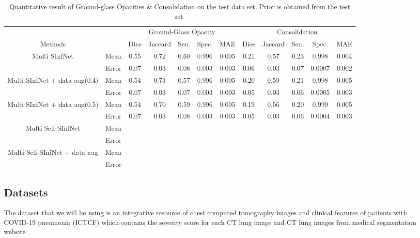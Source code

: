 \begin{table}[!h]
	\centering
	\begin{tabular}{| c | c || c c c c c || c c c c c |}
		\hline
		& &\multicolumn{5}{c||}{Ground-Glass Opacity} & \multicolumn{5}{c|}{Consolidation}\\ \cline{3-12}
		Methods & & Dice & Jaccard & Sen. & Spec. & MAE & Dice & Jaccard & Sen. & Spec. & MAE \\\hline
		Multi SInfNet & Mean & 0.55 & 0.72 & 0.60 & 0.996 & 0.005 & 0.21 & 0.57  &0.23  &0.998  &0.004   \\ \cline{2-12}
		& Error & 0.07 & 0.03 & 0.08 & 0.003 & 0.003 & 0.06 & 0.03 & 0.07 & 0.0007 & 0.002 \\ \hline \hline
		
		Multi SInfNet + data aug(0.4) & Mean & 0.54 & 0.73 & 0.57 & 0.996 & 0.005 & 0.20 & 0.59 & 0.21 & 0.998 & 0.005  \\ \cline{2-12}
		& Error & 0.07 & 0.03 & 0.07 & 0.003 & 0.003 & 0.05 & 0.03 & 0.06 & 0.0005 & 0.003  \\ \hline \hline
		
		Multi SInfNet + data aug(0.5) & Mean & 0.54 & 0.70 & 0.59 & 0.996 & 0.005 & 0.19 & 0.56 & 0.20 & 0.999 & 0.005  \\ \cline{2-12}
		& Error & 0.07 & 0.03 & 0.08 & 0.003 & 0.003 & 0.05 & 0.03 & 0.06 & 0.0004 & 0.003  \\ \hline \hline
		
		Multi Self-SInfNet & Mean & & & & & & & & & &  \\ \cline{2-12}
		& Error & & & & & & & & & &  \\ \hline \hline
		
		Multi Self-SInfNet + data aug & Mean & & & & & & & & & &  \\ \cline{2-12}
		& Error & & & & & & & & & &  \\ \hline \hline
	\end{tabular}
	\caption{Quantitative result of Ground-glass Opacities \& Consolidation on the test data set. Prior is obtained from the test set.}
	\label{tab:multi-strongprior}
\end{table}


\subsection{Datasets}
The dataset that we will be using is an integrative resource of chest computed tomography images and clinical features of patients with COVID-19 pneumonia (ICTCF) \cite{ref23} which contains the severity score for each CT lung image and CT lung images from medical segmentation website \cite{ref26}. 

